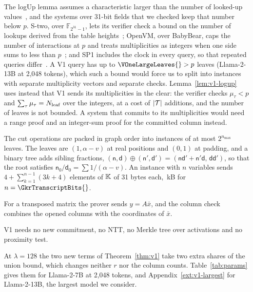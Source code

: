  The logUp lemma assumes a characteristic larger than the number
of looked-up values~\cite[Lemma~5]{haboeck2022logup}, and the systems over 31-bit fields that we
checked keep that number below $p$. S-two, over $\mathbb F_{2^{31}-1}$, lets its verifier check a
bound on the number of lookups derived from the table heights~\cite[Remark~17]{stwo2026};
OpenVM, over BabyBear, caps the number of interactions at $p$ and treats multiplicities as integers
when one side sums to less than $p$~\cite{openvm2025logup}; and SP1 includes the clock in every
query, so that repeated queries differ~\cite{lurk2024lookups}. A V1 query has up to
$\VOneLargeLeaves{}>p$ leaves (Llama-2-13B at 2{,}048 tokens), which such a bound would force us to split into instances with separate
multiplicity vectors and separate checks. Lemma~\ref{lem:v1-logup} uses instead that V1 sends its
multiplicities in the clear: the verifier checks $\mu_\tau<p$ and $\sum_\tau\mu_\tau=N_{\mathrm{leaf}}$ over
the integers, at a cost of $|\mathcal{T}|$ additions, and the number of leaves is not bounded. A system
that commits to its multiplicities would need a range proof and an integer-sum proof for the
committed column instead.

 The cut operations are packed in graph order into instances of
at most $2^{n_{\max}}$ leaves. The leaves are $(1, \alpha - v)$ at real positions and $(0, 1)$ at
padding, and a binary tree adds sibling fractions, $(\mathsf n, \mathsf d) \oplus (\mathsf n',
\mathsf d') = (\mathsf n \mathsf d' + \mathsf n' \mathsf d,\, \mathsf d \mathsf d')$, so that the
root satisfies $\mathsf n_0 / \mathsf d_0 = \sum 1/(\alpha - v)$. An instance with $n$ variables
sends $4 + \sum_{k=1}^{n-1} (3k + 4)$ elements of $\mathbb{K}$ of 31 bytes each, \GkrTranscriptKB{}\,kB for $n = \GkrTranscriptBits{}$.

 For a transposed matrix the prover sends $y = A \bar x$, and the column
check combines the opened columns with the coordinates of $\bar x$.

 V1 needs no new commitment, no NTT, no Merkle tree over activations
and no proximity test.

 At $\lambda = 128$ the two new terms of Theorem~\ref{thm:v1} take two
extra shares of the union bound, which changes neither $r$ nor the column counts.
Table~\ref{tab:params} gives them for Llama-2-7B at 2{,}048 tokens, and
Appendix~\ref{ext:v1-largest} for Llama-2-13B, the largest model we consider.

